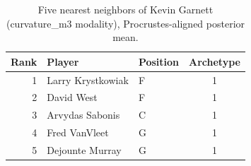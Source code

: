 \begin{table}[htbp]
  \centering\small
  \begin{tabular}{rllc}
    \toprule
    Rank & Player & Position & Archetype \\
    \midrule
    1 & Larry Krystkowiak & F & 1 \\
    2 & David West & F & 1 \\
    3 & Arvydas Sabonis & C & 1 \\
    4 & Fred VanVleet & G & 1 \\
    5 & Dejounte Murray & G & 1 \\
    \bottomrule
  \end{tabular}
  \caption{Five nearest neighbors of Kevin Garnett (curvature_m3 modality), Procrustes-aligned posterior mean.}
  \label{tab:Kevin_Garnett_neighbors_curvature_m3}
\end{table}


